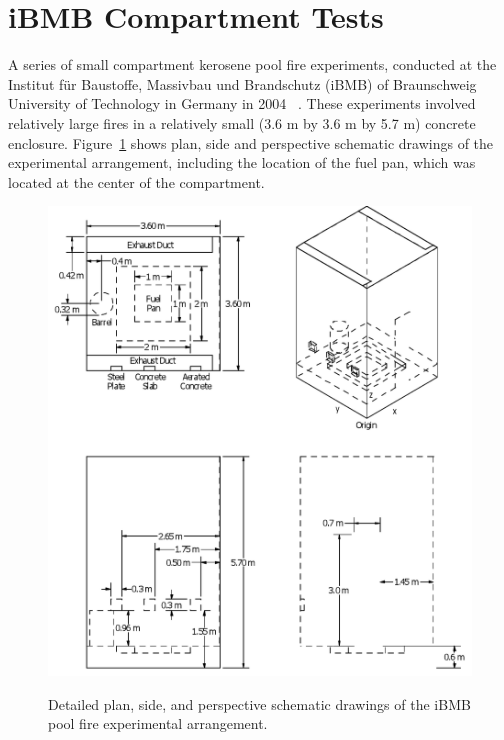 \clearpage


\section{iBMB Compartment Tests}

A series of small compartment kerosene pool fire experiments, conducted at the Institut f\"ur Baustoffe, Massivbau und Brandschutz (iBMB) of Braunschweig University of Technology in Germany in 2004 ~\cite{Klein-Helbetaling:2005}. These experiments involved relatively large fires in a relatively small (3.6 m by 3.6 m by 5.7 m) concrete enclosure. Figure~\ref{fig:iBMB_Pool_Detailed} shows plan, side and perspective schematic drawings of the experimental arrangement, including the location of the fuel pan, which was located at the center of the compartment.

\begin{figure}[p]
\begin{center}
\includegraphics[width=6.5in]{FIGURES/iBMB/iBMB_Pool}\\
\end{center}
\caption{Detailed plan, side, and perspective schematic drawings of the iBMB pool fire experimental arrangement.}
 \label{fig:iBMB_Pool_Detailed}
\end{figure}

